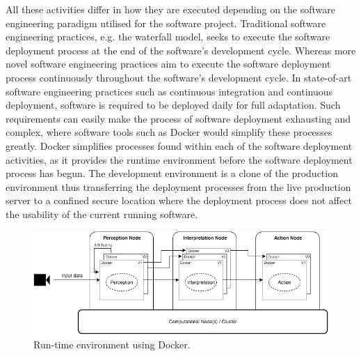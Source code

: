 All these activities differ in how they are executed depending on the software engineering paradigm utilised for the software project. Traditional software engineering practices, e.g. the waterfall model, seeks to execute the software deployment process at the end of the software's development cycle. Whereas more novel software engineering practices aim to execute the software deployment process continuously throughout the software's development cycle. In state-of-art software engineering practices such as continuous integration and continuous deployment, software is required to be deployed daily \cite{meyer2014continuous} for full adaptation. Such requirements can easily make the process of software deployment exhausting and complex, where software tools such as Docker would simplify these processes greatly. Docker simplifies processes found within each of the software deployment activities, as it provides the runtime environment before the software deployment process has begun. The development environment is a clone of the production environment thus transferring the deployment processes from the live production server to a confined secure location where the deployment process does not affect the usability of the current running software.\\


\begin{figure}[ht]
\centering
      \caption{Run-time environment using Docker.}
       \label{containers}
     \includegraphics[width=1.0\textwidth]{./figure/containers.png}
\end{figure}

